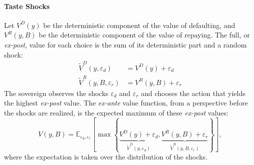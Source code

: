 \documentclass[12pt]{article}
\theoremstyle{plain}
\begin{document}
\paragraph{Taste Shocks}
Let $V^D(y)$ be the deterministic component of the value of defaulting, and
$V^R(y, B)$ be the deterministic component of the value of repaying. The full,
or \textit{ex-post}, value for each choice is the sum of its deterministic part
and a random shock:
\begin{align*}
	\tilde{V}^D(y, \varepsilon_d)    & = V^D(y) + \varepsilon_d    \\
	\tilde{V}^R(y, B, \varepsilon_r) & = V^R(y, B) + \varepsilon_r
\end{align*}
The sovereign observes the shocks $\varepsilon_d$ and $\varepsilon_r$ and chooses the action that yields the highest \textit{ex-post} value. The \textit{ex-ante} value function, from a perspective before the shocks are realized, is the expected maximum of these \textit{ex-post} values:
\begin{equation}
	V(y, B) = \mathbb{E}_{\varepsilon_d, \varepsilon_r} \left[ \max \left\{ \underbrace{V^D(y) + \varepsilon_d}_{\tilde{V}^D(y, \varepsilon_d)}, \underbrace{V^R(y, B) + \varepsilon_r}_{\tilde{V}^R(y, B, \varepsilon_r)} \right\} \right],
\end{equation}
where the expectation is taken over the distribution of the shocks.
\end{document}
